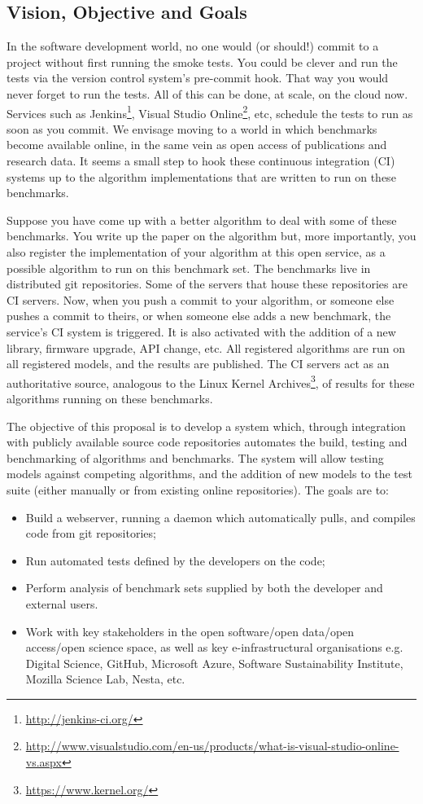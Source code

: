 \documentclass[a4paper,11pt]{article}
\begin{document}
\subsection*{Vision, Objective and Goals}

In the software development world, no one would (or should!) commit to
a project without first running the smoke tests. You could be clever
and run the tests via the version control system's pre-commit
hook. That way you would never forget to run the tests. All of this
can be done, at scale, on the cloud now. Services such as
Jenkins\footnote{\url{http://jenkins-ci.org/}}, Visual Studio
Online\footnote{\url{http://www.visualstudio.com/en-us/products/what-is-visual-studio-online-vs.aspx}},
etc, schedule the tests to run as soon as you commit. We envisage
moving to a world in which benchmarks become available online, in the
same vein as open access of publications and research data. It seems a
small step to hook these continuous integration (CI) systems up to the
algorithm implementations that are written to run on these benchmarks.

Suppose you have come up with a better algorithm to deal with some of
these benchmarks. You write up the paper on the algorithm but, more
importantly, you also register the implementation of your algorithm at
this open service, as a possible algorithm to run on this benchmark
set. The benchmarks live in distributed git 
repositories. Some of the servers that house these repositories are CI
servers. Now, when you push a commit to your algorithm, or someone
else pushes a commit to theirs, or when someone else adds a new
benchmark, the service's CI system is triggered. It is also activated
with the addition of a new library, firmware upgrade, API change,
etc. All registered algorithms are run on all registered models, and
the results are published. The CI servers act as an authoritative
source, analogous to the Linux Kernel
Archives\footnote{\url{https://www.kernel.org/}}, of results for these
algorithms running on these benchmarks.

The objective of this proposal is to develop a system which, through
integration with publicly available source code repositories automates
the build, testing and benchmarking of algorithms and benchmarks. The 
system will allow testing models against competing algorithms, and the
addition of new models to the test suite (either manually or from existing
online repositories). The goals are to:

\begin{itemize}
	\item Build a webserver, running a daemon which automatically pulls, and compiles
code from git repositories;
\item Run automated tests defined by the developers on the code;
\item Perform analysis of benchmark sets supplied by both the developer and external
users.
\item Work with key stakeholders in the open software/open data/open access/open
  science space, as well as key e-infrastructural organisations
  e.g. Digital Science, GitHub, Microsoft
  Azure, Software Sustainability Institute, Mozilla Science Lab,
  Nesta, etc.
\end{itemize}
\end{document}
